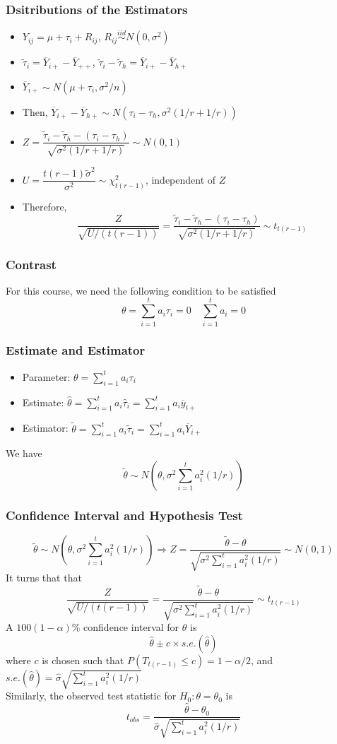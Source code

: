 \documentclass[11pt]{article}
\begin{document}
\subsubsection{Dsitributions of the Estimators}
\begin{itemize}
    \item $Y_{ij}=\mu+\tau_i+R_{ij}$, $R_{ij}\overset{iid}{\sim}N(0,\sigma^2)$
    \item $\tilde{\tau}_i=\overline{Y}_{i+}-\overline{Y}_{++}$, $\tilde{\tau}_i-\tilde{\tau}_h = \overline{Y}_{i+}-\overline{Y}_{h+}$
    \item $\overline{Y}_{i+}\sim N(\mu+\tau_i, \sigma^2/n)$
    \item Then, $\overline{Y}_{i+}-\overline{Y}_{h+}\sim N(\tau_i-\tau_h, \sigma^2(1/r+1/r))$
    \item $Z=\dfrac{\tilde{\tau}_i-\tilde{\tau}_h-(\tau_i-\tau_h)}{\sqrt{\sigma^2(1/r+1/r)}}\sim N(0,1)$
    \item $U=\dfrac{t(r-1)\tilde{\sigma}^2}{\sigma^2}\sim \chi^2_{t(r-1)}$, independent of $Z$ 
    \item Therefore, \[\dfrac{Z}{\sqrt{U/(t(r-1))}} = \dfrac{\tilde{\tau}_i-\tilde{\tau}_h-(\tau_i-\tau_h)}{\sqrt{\sigma^2(1/r+1/r)}}\sim t_{t(r-1)}\]
\end{itemize}
\subsubsection{Contrast}
For this course, we need the following condition to be satisfied
\[\theta=\sum_{i=1}^{t}a_i\tau_i=0\quad\sum_{i=1}^{t}a_i=0\]
\subsubsection*{Estimate and Estimator}
\begin{itemize}
    \item Parameter: $\theta=\sum_{i=1}^{t}a_i\tau_i$
    \item Estimate: $\hat\theta=\sum_{i=1}^{t}a_i\hat\tau_i = \sum_{i=1}^{t}a_i\overline{y}_{i+}$
    \item Estimator: $\tilde{\theta}=\sum_{i=1}^{t}a_i\tilde{\tau}_i = \sum_{i=1}^{t}a_i\overline{Y}_{i+}$
\end{itemize}
We have 
\[\tilde{\theta}\sim N(\theta, \sigma^2\sum_{i=1}^{t}a_i^2(1/r))\]
\subsubsection{Confidence Interval and Hypothesis Test}
\[\tilde{\theta}\sim N(\theta, \sigma^2\sum_{i=1}^{t}a_i^2(1/r))\Rightarrow Z=\frac{\tilde{\theta}-\theta}{\sqrt{\sigma^2\sum_{i=1}^{t}a_i^2(1/r)}}\sim N(0,1)\]
It turns that that 
\[\frac{Z}{\sqrt{U/(t(r-1))}} = \frac{\tilde{\theta}-\theta}{\sqrt{\sigma^2\sum_{i=1}^{t}a_i^2(1/r)}}\sim t_{t(r-1)}\]
A $100(1-\alpha)\%$ confidence interval for $\theta$ is
\[\hat\theta\pm c\times s.e.(\hat\theta)\]
where $c$ is chosen such that $P(T_{t(r-1)}\leq c)=1-\alpha/2$, and $s.e.(\hat\theta)=\hat\sigma\sqrt{\sum_{i=1}^{t}a_i^2(1/r)}$ \\
Similarly, the observed test statistic for $H_0:\theta=\theta_0$ is
\[t_{obs} = \frac{\hat\theta-\theta_0}{\hat\sigma\sqrt{\sum_{i=1}^{t}a_i^2(1/r)}}\]
\end{document}
